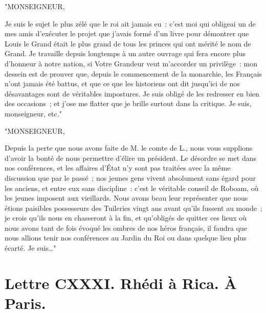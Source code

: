 \documentclass[french,twoside]{book} %
\newcommand{\dateline}[1]{\medskip{\RaggedLeft{#1}\par}\bigskip}
\begin{document}
\noindent "MONSEIGNEUR,\par
Je suis le sujet le plus zélé que le roi ait jamais eu : c’est moi qui obligeai un de mes amis d’exécuter le projet que j’avais formé d’un livre pour démontrer que Louis le Grand était le plus grand de tous les princes qui ont mérité le nom de Grand. Je travaille depuis longtemps à un autre ouvrage qui fera encore plus d’honneur à notre nation, si Votre Grandeur veut m’accorder un privilège : mon dessein est de prouver que, depuis le commencement de la monarchie, les Français n’ont jamais été battus, et que ce que les historiens ont dit jusqu’ici de nos désavantages sont de véritables impostures. Je suis obligé de les redresser en bien des occasions ; et j’ose me flatter que je brille surtout dans la critique. Je suis, monseigneur, etc."\par
"MONSEIGNEUR,\par
Depuis la perte que nous avons faite de M. le comte de L., nous vous supplions d’avoir la bonté de nous permettre d’élire un président. Le désordre se met dans nos conférences, et les affaires d’État n’y sont pas traitées avec la même discussion que par le passé ; nos jeunes gens vivent absolument sans égard pour les anciens, et entre eux sans discipline : c’est le véritable conseil de Roboam, où les jeunes imposent aux vieillards. Nous avons beau leur représenter que nous étions paisibles possesseurs des Tuileries vingt ans avant qu’ils fussent au monde ; je crois qu’ils nous en chasseront à la fin, et qu’obligés de quitter ces lieux où nous avons tant de fois évoqué les ombres de nos héros français, il faudra que nous allions tenir nos conférences au Jardin du Roi ou dans quelque lieu plus écarté. Je suis…"\par

\dateline{De Paris, le 7 de la lune de Gemmadi 2, 1719.}
\section[{Lettre CXXXI. Rhédi à Rica. À Paris.}]{Lettre CXXXI. Rhédi à Rica. À Paris.}\renewcommand{\leftmark}{Lettre CXXXI. Rhédi à Rica. À Paris.}
\end{document}
